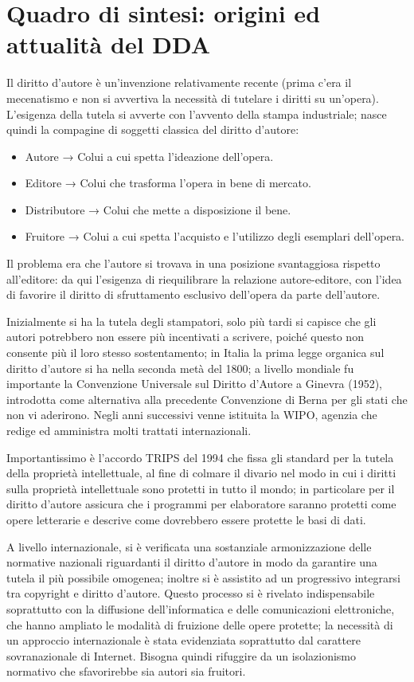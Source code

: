 \section{Quadro di sintesi: origini ed attualità del DDA}

Il diritto d’autore è un’invenzione relativamente recente (prima c’era il mecenatismo e non si avvertiva la
necessità di tutelare i diritti su un’opera). L’esigenza della tutela si avverte con l’avvento della stampa
industriale; nasce quindi la compagine di soggetti classica del diritto d’autore:
\begin{itemize}
    \item Autore → Colui a cui spetta l’ideazione dell’opera.
    \item Editore → Colui che trasforma l’opera in bene di mercato.
    \item Distributore → Colui che mette a disposizione il bene.
    \item Fruitore → Colui a cui spetta l'acquisto e l’utilizzo degli esemplari dell’opera.
\end{itemize}

Il problema era che l’autore si trovava in una posizione svantaggiosa rispetto all’editore: da qui l’esigenza di riequilibrare la relazione autore-editore, con l’idea di favorire il diritto di sfruttamento esclusivo dell’opera da parte dell’autore.


Inizialmente si ha la tutela degli stampatori, solo più tardi si capisce che gli autori potrebbero non essere più incentivati a scrivere, poiché questo non consente più il loro stesso sostentamento; in Italia la prima legge organica sul diritto d'autore si ha nella seconda metà del 1800; a livello mondiale fu importante la Convenzione Universale sul Diritto d’Autore a Ginevra (1952), introdotta come alternativa alla precedente Convenzione di Berna per gli stati che non vi aderirono. Negli anni successivi venne istituita la WIPO, agenzia che redige ed amministra molti trattati internazionali.


Importantissimo è l’accordo TRIPS del 1994 che fissa gli standard per la tutela della proprietà intellettuale, al fine di colmare il divario nel modo in cui i diritti sulla proprietà intellettuale sono protetti in tutto il mondo; in particolare per il diritto d’autore assicura che i programmi per elaboratore saranno protetti come opere letterarie e descrive come dovrebbero essere protette le basi di dati.


A livello internazionale, si è verificata una sostanziale armonizzazione delle normative nazionali riguardanti il diritto d’autore in modo da garantire una tutela il più possibile omogenea; inoltre si è assistito ad un progressivo integrarsi tra copyright e diritto d’autore. Questo processo si è rivelato indispensabile soprattutto con la diffusione dell’informatica e delle comunicazioni elettroniche, che hanno ampliato le modalità di fruizione delle opere protette; la necessità di un approccio internazionale è stata evidenziata soprattutto dal carattere sovranazionale di Internet. Bisogna quindi rifuggire da un isolazionismo normativo che sfavorirebbe sia autori sia fruitori.


